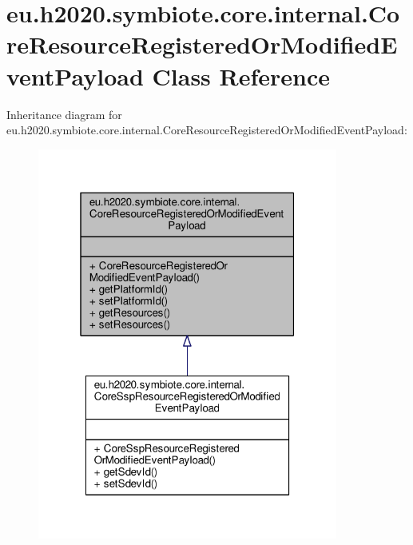 \hypertarget{classeu_1_1h2020_1_1symbiote_1_1core_1_1internal_1_1CoreResourceRegisteredOrModifiedEventPayload}{}\section{eu.\+h2020.\+symbiote.\+core.\+internal.\+Core\+Resource\+Registered\+Or\+Modified\+Event\+Payload Class Reference}
\label{classeu_1_1h2020_1_1symbiote_1_1core_1_1internal_1_1CoreResourceRegisteredOrModifiedEventPayload}


Inheritance diagram for eu.\+h2020.\+symbiote.\+core.\+internal.\+Core\+Resource\+Registered\+Or\+Modified\+Event\+Payload\+:
\nopagebreak
\begin{figure}[H]
\begin{center}
\leavevmode
\includegraphics[width=280pt]{classeu_1_1h2020_1_1symbiote_1_1core_1_1internal_1_1CoreResourceRegisteredOrModifiedEventPayload__inherit__graph}
\end{center}
\end{figure}


